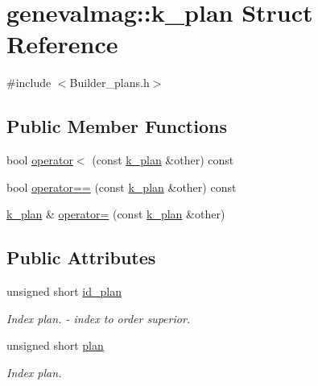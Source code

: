 \hypertarget{structgenevalmag_1_1k__plan}{
\section{genevalmag::k\_\-plan Struct Reference}
\label{structgenevalmag_1_1k__plan}
}


{\ttfamily \#include $<$Builder\_\-plans.h$>$}

\subsection*{Public Member Functions}
\begin{DoxyCompactItemize}
\item 
bool \hyperlink{structgenevalmag_1_1k__plan_a86eb6ce02cbf73824a1f34603cfc6b9f}{operator$<$} (const \hyperlink{structgenevalmag_1_1k__plan}{k\_\-plan} \&other) const 
\item 
bool \hyperlink{structgenevalmag_1_1k__plan_a1ebe5a12c410624fec9631ff2e522767}{operator==} (const \hyperlink{structgenevalmag_1_1k__plan}{k\_\-plan} \&other) const 
\item 
\hyperlink{structgenevalmag_1_1k__plan}{k\_\-plan} \& \hyperlink{structgenevalmag_1_1k__plan_a1e209c36e06a2f83d17287e7e31f5ba8}{operator=} (const \hyperlink{structgenevalmag_1_1k__plan}{k\_\-plan} \&other)
\end{DoxyCompactItemize}
\subsection*{Public Attributes}
\begin{DoxyCompactItemize}
\item 
unsigned short \hyperlink{structgenevalmag_1_1k__plan_a477573001560bced8ad15aa7a5013ac0}{id\_\-plan}
\begin{DoxyCompactList}\small\item\em Index plan. -\/ index to order superior. \item\end{DoxyCompactList}\item 
unsigned short \hyperlink{structgenevalmag_1_1k__plan_ac948a26cdaa4b9ea54cc04ac27c99e3c}{plan}
\begin{DoxyCompactList}\small\item\em Index plan. \item\end{DoxyCompactList}\end{DoxyCompactItemize}


